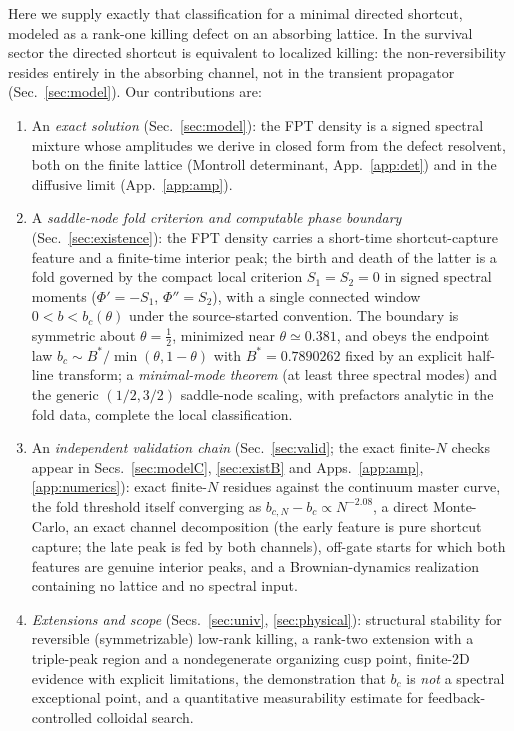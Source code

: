 \documentclass[reprint,amsmath,amssymb,aps,prresearch,longbibliography]{revtex4-2}
\begin{document}
Here we supply exactly that classification for a minimal directed shortcut, modeled as a rank-one
killing defect on an absorbing lattice. In the survival sector the directed shortcut is equivalent
to localized killing: the non-reversibility resides entirely in the absorbing channel, not in the
transient propagator (Sec.~\ref{sec:model}). Our contributions are:
\begin{enumerate}
\item An \emph{exact solution} (Sec.~\ref{sec:model}): the FPT density is a signed spectral mixture
whose amplitudes we derive in closed form from the defect resolvent, both on the finite lattice
(Montroll determinant, App.~\ref{app:det}) and in the diffusive limit (App.~\ref{app:amp}).
\item A \emph{saddle-node fold criterion and computable phase boundary}
(Sec.~\ref{sec:existence}): the FPT density carries a short-time shortcut-capture feature and a
finite-time interior peak; the birth and death of the latter is a fold governed by the compact local
criterion $S_1=S_2=0$ in signed spectral moments ($\Phi'=-S_1$, $\Phi''=S_2$), with a single
connected window $0<b<b_c(\theta)$ under the source-started convention. The boundary is symmetric
about $\theta=\tfrac12$, minimized near $\theta\simeq0.381$, and obeys the endpoint law $b_c\sim
B^*/\min(\theta,1-\theta)$ with $B^*=0.7890262$ fixed by an explicit half-line transform; a
\emph{minimal-mode theorem} (at least three spectral modes) and the generic $(1/2,3/2)$ saddle-node
scaling, with prefactors analytic in the fold data, complete the local classification.
\item An \emph{independent validation chain} (Sec.~\ref{sec:valid}; the exact finite-$N$ checks
appear in Secs.~\ref{sec:modelC}, \ref{sec:existB} and Apps.~\ref{app:amp}, \ref{app:numerics}):
exact finite-$N$ residues
against the continuum master curve, the fold threshold itself converging as
$b_{c,N}-b_c\propto N^{-2.08}$, a direct Monte-Carlo, an exact channel decomposition (the early
feature is pure shortcut capture; the late peak is fed by both channels), off-gate starts for which
both features are genuine interior peaks, and a Brownian-dynamics realization containing no lattice
and no spectral input.
\item \emph{Extensions and scope} (Secs.~\ref{sec:univ}, \ref{sec:physical}): structural stability
for reversible (symmetrizable) low-rank killing, a rank-two extension with a triple-peak region and
a nondegenerate organizing cusp point, finite-2D evidence with explicit limitations, the
demonstration that $b_c$ is \emph{not} a spectral exceptional point, and a quantitative
measurability estimate for feedback-controlled colloidal search.
\end{enumerate}
\end{document}
